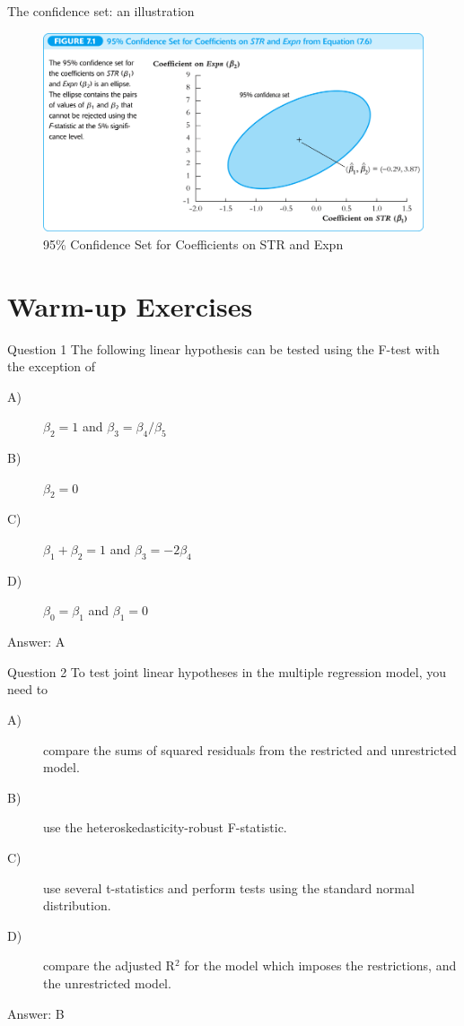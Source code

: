 \documentclass[presentation,10pt]{beamer}
\begin{document}
\begin{frame}[label={sec:orgc252728}]{The confidence set: an illustration}
\begin{figure}[htbp]
\centering
\includegraphics[width=.9\linewidth]{img/fig-7-1.png}
\caption{\label{fig:org1943a27}
95\% Confidence Set for Coefficients on STR and Expn}
\end{figure}
\end{frame}


\section{Warm-up Exercises}
\label{sec:org5994556}
\begin{frame}[label={sec:org55ee11e}]{Question 1}
The following linear hypothesis can be tested using the F-test with the exception of
\begin{description}
\item[{A)}] \(\beta_2=1\) and \(\beta_3 = \beta_4 / \beta_5\)
\item[{B)}] \(\beta_2=0\)
\item[{C)}] \(\beta_1 + \beta_2 = 1\) and \(\beta_3 = -2\beta_4\)
\item[{D)}] \(\beta_0 = \beta_1\) and \(\beta_1 = 0\)
\end{description}
\pause
Answer: A
\end{frame}

\begin{frame}[label={sec:org76f72d6}]{Question 2}
To test joint linear hypotheses in the multiple regression model, you need to
\begin{description}
\item[{A)}] compare the sums of squared residuals from the restricted and unrestricted model.
\item[{B)}] use the heteroskedasticity-robust F-statistic.
\item[{C)}] use several t-statistics and perform tests using the standard normal distribution.
\item[{D)}] compare the adjusted R\(^{\text{2}}\) for the model which imposes the restrictions, and the unrestricted model.
\end{description}
\pause
Answer:  B
\end{frame}
\end{document}
